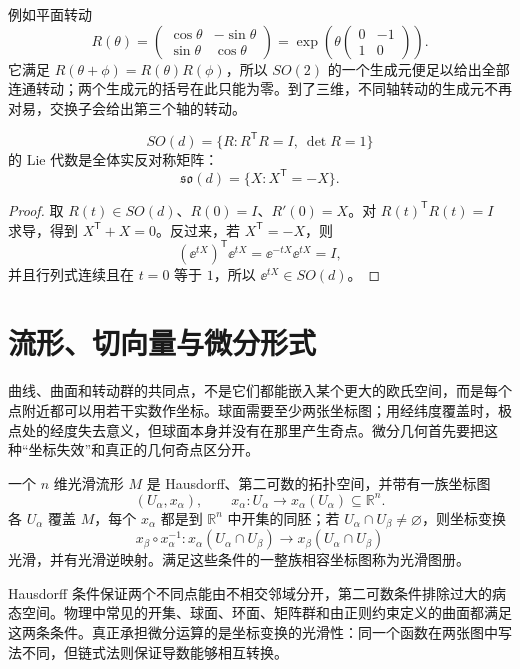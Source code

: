 例如平面转动
\[
R(\theta)=\begin{pmatrix}\cos\theta&-\sin\theta\\
\sin\theta&\cos\theta\end{pmatrix}
=\exp\!\left(\theta\begin{pmatrix}0&-1\\1&0\end{pmatrix}\right).
\]
它满足 $R(\theta+\phi)=R(\theta)R(\phi)$，所以 $SO(2)$ 的一个生成元便足以给出全部连通转动；两个生成元的括号在此只能为零。到了三维，不同轴转动的生成元不再对易，交换子会给出第三个轴的转动。

\begin{proposition}
\[
SO(d)=\{R:R^{\mathsf T}R=I,\ \det R=1\}
\]
的 Lie 代数是全体实反对称矩阵：
\[
\mathfrak{so}(d)=\{X:X^{\mathsf T}=-X\}.
\]
\end{proposition}

\begin{proof}
取 \(R(t)\in SO(d)\)、\(R(0)=I\)、\(R'(0)=X\)。对
\(R(t)^{\mathsf T}R(t)=I\) 求导，得到
\(X^{\mathsf T}+X=0\)。反过来，若 \(X^{\mathsf T}=-X\)，则
\[
(\ee^{tX})^{\mathsf T}\ee^{tX}
=\ee^{-tX}\ee^{tX}=I,
\]
并且行列式连续且在 \(t=0\) 等于 \(1\)，所以
\(\ee^{tX}\in SO(d)\)。
\end{proof}

\section{流形、切向量与微分形式}

曲线、曲面和转动群的共同点，不是它们都能嵌入某个更大的欧氏空间，而是每个点附近都可以用若干实数作坐标。球面需要至少两张坐标图；用经纬度覆盖时，极点处的经度失去意义，但球面本身并没有在那里产生奇点。微分几何首先要把这种“坐标失效”和真正的几何奇点区分开。

\begin{definition}[光滑流形]
一个 \(n\) 维光滑流形 \(M\) 是 Hausdorff、第二可数的拓扑空间，并带有一族坐标图
\[
(U_\alpha,x_\alpha),\qquad
x_\alpha:U_\alpha\longrightarrow x_\alpha(U_\alpha)\subseteq\mathbb R^n.
\]
各 \(U_\alpha\) 覆盖 \(M\)，每个 \(x_\alpha\) 都是到 \(\mathbb R^n\) 中开集的同胚；若 \(U_\alpha\cap U_\beta\ne\varnothing\)，则坐标变换
\[
x_\beta\circ x_\alpha^{-1}:
x_\alpha(U_\alpha\cap U_\beta)\longrightarrow
x_\beta(U_\alpha\cap U_\beta)
\]
光滑，并有光滑逆映射。满足这些条件的一整族相容坐标图称为光滑图册。
\end{definition}

Hausdorff 条件保证两个不同点能由不相交邻域分开，第二可数条件排除过大的病态空间。物理中常见的开集、球面、环面、矩阵群和由正则约束定义的曲面都满足这两条条件。真正承担微分运算的是坐标变换的光滑性：同一个函数在两张图中写法不同，但链式法则保证导数能够相互转换。

